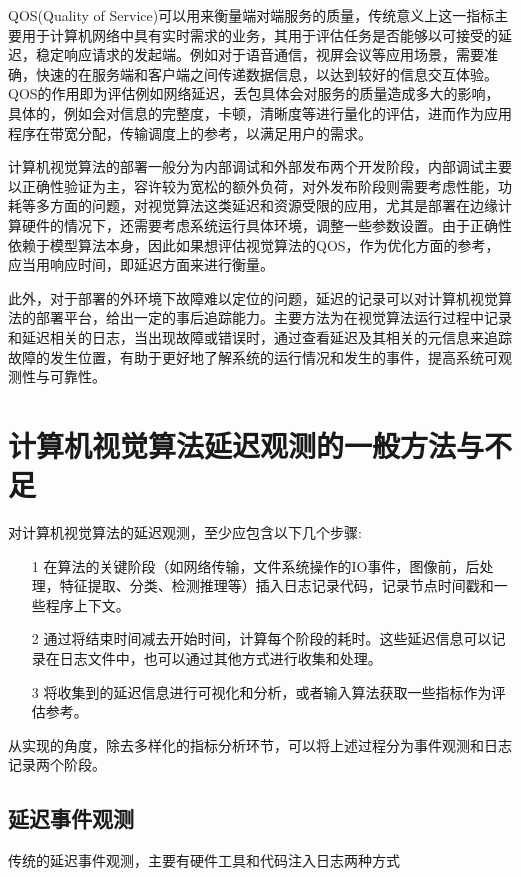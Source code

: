 \documentclass[master]{shtthesis}
\begin{document}
QOS(Quality of Service)可以用来衡量端对端服务的质量，传统意义上这一指标主要用于计算机网络中具有实时需求的业务，其用于评估任务是否能够以可接受的延迟，稳定响应请求的发起端。例如对于语音通信，视屏会议等应用场景，需要准确，快速的在服务端和客户端之间传递数据信息，以达到较好的信息交互体验。QOS的作用即为评估例如网络延迟，丢包具体会对服务的质量造成多大的影响，具体的，例如会对信息的完整度，卡顿，清晰度等进行量化的评估，进而作为应用程序在带宽分配，传输调度上的参考，以满足用户的需求。

计算机视觉算法的部署一般分为内部调试和外部发布两个开发阶段，内部调试主要以正确性验证为主，容许较为宽松的额外负荷，对外发布阶段则需要考虑性能，功耗等多方面的问题，对视觉算法这类延迟和资源受限的应用，尤其是部署在边缘计算硬件的情况下，还需要考虑系统运行具体环境，调整一些参数设置。由于正确性依赖于模型算法本身，因此如果想评估视觉算法的QOS，作为优化方面的参考，应当用响应时间，即延迟方面来进行衡量。

此外，对于部署的外环境下故障难以定位的问题，延迟的记录可以对计算机视觉算法的部署平台，给出一定的事后追踪能力。主要方法为在视觉算法运行过程中记录和延迟相关的日志，当出现故障或错误时，通过查看延迟及其相关的元信息来追踪故障的发生位置，有助于更好地了解系统的运行情况和发生的事件，提高系统可观测性与可靠性。

\section{计算机视觉算法延迟观测的一般方法与不足}\label{现有计算机视觉算法延迟观测的一般方法与不足}
对计算机视觉算法的延迟观测，至少应包含以下几个步骤:
\begin{itemize}
	\item[1]在算法的关键阶段（如网络传输，文件系统操作的IO事件，图像前，后处理，特征提取、分类、检测推理等）插入日志记录代码，记录节点时间戳和一些程序上下文。
	\item[2]通过将结束时间减去开始时间，计算每个阶段的耗时。这些延迟信息可以记录在日志文件中，也可以通过其他方式进行收集和处理。
	\item[3] 将收集到的延迟信息进行可视化和分析，或者输入算法获取一些指标作为评估参考。
\end{itemize}

从实现的角度，除去多样化的指标分析环节，可以将上述过程分为事件观测和日志记录两个阶段。

\subsection{延迟事件观测}\label{延迟事件观测}
传统的延迟事件观测，主要有硬件工具和代码注入日志两种方式
\end{document}
